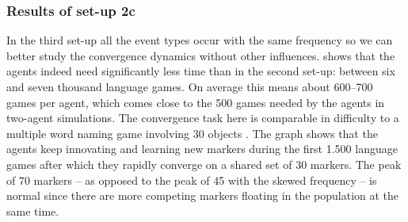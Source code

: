 \subsubsection{Results of set-up 2c}
 In the third set-up all the event types occur with the same frequency so we can better study the convergence dynamics without other influences.  shows that the agents indeed need significantly less time than in the second set-up: between six and seven thousand language games. On average this means about 600--700 games per agent, which comes close to the 500 games needed by the agents in two-agent simulations. The convergence task here is comparable in difficulty to a multiple word naming game involving 30 objects \citep[see][]{vanlooveren05design}. The graph shows that the agents keep innovating and learning new markers during the first 1.500 language games after which they rapidly converge on a shared set of 30 markers. The peak of 70 markers -- as opposed to the peak of 45 with the skewed frequency -- is normal since there are more competing markers floating in the population at the same time.

